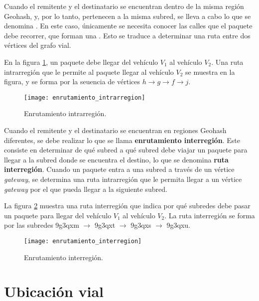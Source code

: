 Cuando el remitente y el destinatario se encuentran dentro de la misma región
Geohash, y, por lo tanto, pertenecen a la misma subred, se lleva a cabo lo que
se denomina . En este caso, únicamente se
necesita conocer las calles que el paquete debe recorrer, que forman una
. Esto se traduce a determinar una ruta entre dos
vértices del grafo vial.

En la figura \ref{fig:enrutamiento_intrarregion}, un paquete debe llegar del
vehículo $V_1$ al vehículo $V_2$. Una ruta intrarregión que le permite al
paquete llegar al vehículo $V_2$ se muestra en la figura, y se forma por la
seuencia de vértices $h \rightarrow g \rightarrow f \rightarrow j$.

\begin{figure}[th!]
\centering
\texttt{[image: enrutamiento\_intrarregion]}
\decoRule
\caption[Enrutamiento intrarregión]{Enrutamiento intrarregión.}
\label{fig:enrutamiento_intrarregion}
\end{figure}

Cuando el remitente y el destinatario se encuentran en regiones Geohash
diferentes, se debe realizar lo que se llama \textbf{enrutamiento interregión}.
Este consiste en determinar de qué subred a qué subred debe viajar un paquete
para llegar a la subred donde se encuentra el destino, lo que se denomina
\textbf{ruta interregión}. Cuando un paquete entra a una subred a través de un
vértice \textit{gateway}, se determina una ruta intrarregión que le permita
llegar a un vértice \textit{gateway} por el que pueda llegar a la siguiente
subred.

La figura \ref{fig:enrutamiento_interregion} muestra una ruta interregión que
indica por qué subredes debe pasar un paquete para llegar del vehículo $V_1$
al vehículo $V_2$. La ruta interregión se forma por las subredes 9g3qxm
$\rightarrow$ 9g3qxt $\rightarrow$ 9g3qxs $\rightarrow$ 9g3qxu.

\begin{figure}[th!]
\centering
\texttt{[image: enrutamiento\_interregion]}
\decoRule
\caption[Enrutamiento interregión]{Enrutamiento interregión.}
\label{fig:enrutamiento_interregion}
\end{figure}

\section{Ubicación vial}

